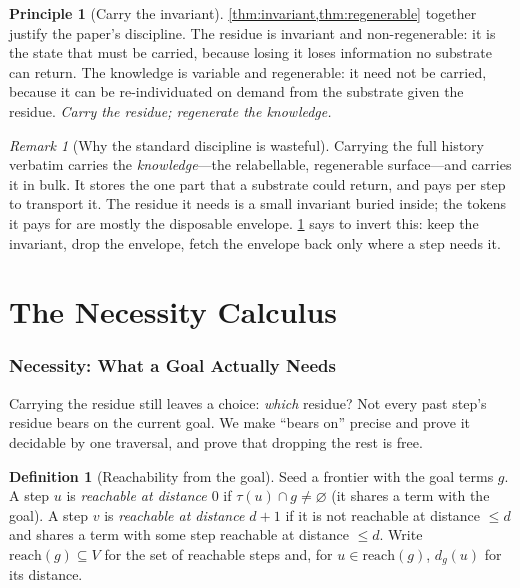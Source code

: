 \documentclass[11pt,a4paper]{article}
\theoremstyle{thmstyle}
\theoremstyle{definition}
\newtheorem{definition}[theorem]{Definition}
\newtheorem{principle}[theorem]{Principle}
\theoremstyle{remark}
\newtheorem{remark}[theorem]{Remark}
\newcommand{\Vrt}{V}
\newcommand{\goal}{g}                   %
\newcommand{\reach}{\mathrm{reach}}
\begin{document}
\begin{principle}[Carry the invariant]
\label{prin:carry}
\cref{thm:invariant,thm:regenerable} together justify the paper's discipline.
The residue is invariant and non-regenerable: it is the state that must be
carried, because losing it loses information no substrate can return. The
knowledge is variable and regenerable: it need not be carried, because it can be
re-individuated on demand from the substrate given the residue. \emph{Carry the
residue; regenerate the knowledge.}
\end{principle}

\begin{remark}[Why the standard discipline is wasteful]
\label{rem:waste}
Carrying the full history verbatim carries the \emph{knowledge}---the
relabellable, regenerable surface---and carries it in bulk. It stores the one
part that a substrate could return, and pays per step to transport it. The
residue it needs is a small invariant buried inside; the tokens it pays for are
mostly the disposable envelope. \cref{prin:carry} says to invert this: keep the
invariant, drop the envelope, fetch the envelope back only where a step needs it.
\end{remark}

\part{The Necessity Calculus}

\section{Necessity: What a Goal Actually Needs}
\label{sec:necessity}

Carrying the residue still leaves a choice: \emph{which} residue? Not every past
step's residue bears on the current goal. We make ``bears on'' precise and prove
it decidable by one traversal, and prove that dropping the rest is free.

\begin{definition}[Reachability from the goal]
\label{def:reach}
Seed a frontier with the goal terms $\goal$. A step $u$ is \emph{reachable at
distance $0$} if $\tau(u)\cap\goal\neq\varnothing$ (it shares a term with the
goal). A step $v$ is \emph{reachable at distance $d+1$} if it is not reachable at
distance $\le d$ and shares a term with some step reachable at distance $\le d$.
Write $\reach(\goal)\subseteq\Vrt$ for the set of reachable steps and, for
$u\in\reach(\goal)$, $d_\goal(u)$ for its distance.
\end{definition}
\end{document}
